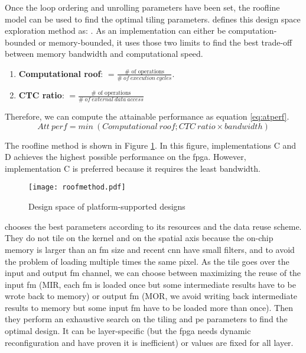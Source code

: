Once the loop ordering and unrolling parameters have been set, the roofline model can be used to find the optimal tiling parameters. \textcite{mittal_survey_2020} defines this design space exploration method as: . As an implementation can either be computation-bounded or memory-bounded, it uses those two limits to find the best trade-off between memory bandwidth and computational speed.
\begin{enumerate}
    \item \textbf{Computational roof}: $= \frac{\text{\# \ of \ operations}}{\# \ of \ execution \ cycles}$.
    \item \textbf{CTC ratio}: $= \frac{\text{\# \ of \ operations}}{\# \ of \ external \ data \ access}$
\end{enumerate}
Therefore, we can compute the attainable performance as equation \ref{eq:atperf}.
\begin{equation}
Att \ perf = min \ (Computational \ roof; CTC \ ratio \times bandwidth)
\label{eq:atperf}
\end{equation}

The roofline method is shown in Figure \ref{fig:roofmeth}. In this figure, implementations C and D achieves the highest possible performance on the \acrshort{fpga}. However, implementation C is preferred because it requires the least bandwidth.
%
\begin{figure}
    \centering
    \texttt{[image: roofmethod.pdf]}
    \caption{Design space of platform-supported designs  \cite{zhang_optimizing_2015}}
    \label{fig:roofmeth}
\end{figure}

\cite{motamedi_placid_2017} chooses the best parameters according to its resources and the data reuse scheme. They do not tile on the kernel and on the spatial axis because the on-chip memory is larger than an \acrshort{fm} size and recent \acrshort{cnn} have small filters, and to avoid the problem of loading multiple times the same pixel. As the tile goes over the input and output \acrshort{fm} channel, we can choose between maximizing the reuse of the input \acrshort{fm} (MIR, each \acrshort{fm} is loaded once but some intermediate results have to be wrote back to memory) or output \acrshort{fm} (MOR, we avoid writing back intermediate results to memory but some input \acrshort{fm} have to be loaded more than once). Then they perform an exhaustive search on the tiling and \acrshort{pe} parameters to find the optimal design. It can be layer-specific (but the \acrshort{fpga} needs dynamic reconfiguration and \textcite{zhang_optimizing_2015} have proven it is inefficient) or values are fixed for all layer.

